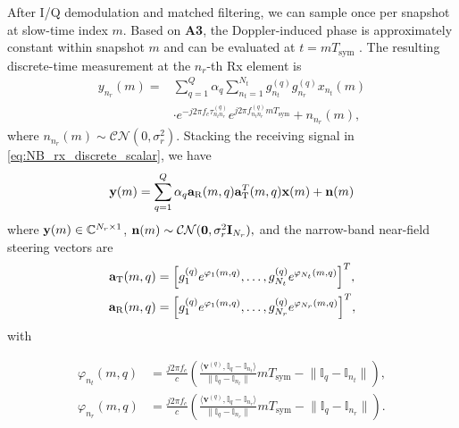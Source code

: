 \documentclass[9pt,final,journal,twocolumn]{IEEEtran}
\begin{document}
After I/Q demodulation and matched filtering, we can sample once per snapshot at slow-time index $m$. Based on \textbf{A3}, the Doppler-induced phase is approximately constant within snapshot $m$ and can be evaluated at $t=mT_{\mathrm{sym}}$ \cite{richards2010principles}. The resulting discrete-time measurement at the $n_r$-th Rx element is
\begin{align}\label{eq:NB_rx_discrete_scalar}
y_{n_r}(m)
=
&\sum_{q=1}^{Q}\alpha_q
\sum_{n_t=1}^{N_t}
g_{n_t}^{(q)}g_{n_r}^{(q)}
x_{n_t}(m) \nonumber\\
&\cdot e^{-j2\pi f_c\tau_{n_tn_r}^{(q)}}
e^{j2\pi f_{n_tn_r}^{(q)}mT_{\mathrm{sym}}}
+n_{n_r}(m),
\end{align}
where $n_{n_r}(m)\sim\mathcal{CN}(0,\sigma_r^2)$.
Stacking the receiving signal in \eqref{eq:NB_rx_discrete_scalar}, we have 
\begin{align}\label{eq:NB_rx_vector}
{\bf y}(m)
=\sum_{q=1}^{Q}\alpha_q{\bf a}_{\mathrm{R}}(m,q){\bf a}_{\mathrm{T}}^{T}(m,q){\bf x}(m)+{\bf n}(m)
\end{align}
where ${\bf y}(m)\in\mathbb{C}^{N_r\times 1}$, ${\bf n}(m)\sim\mathcal{CN}({\bf 0},\sigma_r^2{\bf I}_{N_r}),$
and the narrow-band near-field steering vectors are
\begin{subequations} \label{eq:NB_steering}
\begin{align}
{\bf a}_{\mathrm{T}}(m,q)
&=
\Big[g_{1}^{(q)}e^{\varphi_{1}(m,q)},\ldots,g_{N_t}^{(q)}e^{\varphi_{N_t}(m,q)}\Big]^T,  \label{eq:NB_steering_Tx}\\
{\bf a}_{\mathrm{R}}(m,q)
&=
\Big[g_{1}^{(q)}e^{\varphi_{1}(m,q)},\ldots,g_{N_r}^{(q)}e^{\varphi_{N_r}(m,q)}\Big]^T, \label{eq:NB_steering_Rx}
\end{align}
\end{subequations}
with
\begin{small}
\begin{subequations} \label{eq:NB_phase_TxRx}
\begin{flalign}
\varphi_{n_t}(m,q)
&\!=\!\frac{j2\pi f_c}{c}\left(
\frac{\langle{\bm v}^{(q)},{\mathbb I}_q\!-\!{\mathbb I}_{n_t}\rangle}{\|{\mathbb I}_q\!-\!{\mathbb I}_{n_t}\|}mT_{\mathrm{sym}}
\!-\!\|{\mathbb I}_q\!-\!{\mathbb I}_{n_t}\|\!
\right),\\
\varphi_{n_r}(m,q)
&\!=\!\frac{j2\pi f_c}{c}\left(
\frac{\langle{\bm v}^{(q)},{\mathbb I}_q\!-\!{\mathbb I}_{n_r}\rangle}{\|{\mathbb I}_q\!-\!{\mathbb I}_{n_r}\|}mT_{\mathrm{sym}}
\!-\!\|{\mathbb I}_q\!-\!{\mathbb I}_{n_r}\|\!
\right).
\end{flalign}
\end{subequations}
\end{small}
\end{document}
